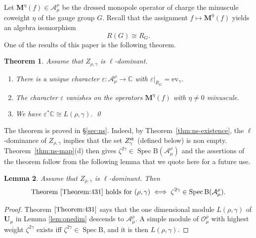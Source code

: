 \documentclass[11pt,reqno]{amsart}
\newtheorem{Theorem}{Theorem}[section]
\newtheorem{Lemma}[Theorem]{Lemma}
\theoremstyle{definition}
\theoremstyle{remark}
\def\bbC{\mathbb C}
\def\scrO{\mathscr O}
\def\B{\mathrm B}
\def\calA{\mathcal A}
\def\bfU{\mathbf U}
\def\Spec{\operatorname{Spec}}
\def\ev{\mathrm{ev}}
\providecommand{\bfM}{\mathbf M}
\begin{document}
Let $\bfM^\eta(f)\in\calA^\rho_\mu$ be the dressed monopole operator of charge the minuscule coweight $\eta$ of the gauge group $G$.
Recall that the assignment $f\mapsto \bfM^0(f)$ yields an algebra isomorphism
$$R(G)\cong R_G.$$
One of the results of this paper is the following theorem.


\begin{Theorem}\label{Theorem:431}
Assume that $Z_{\rho,\gamma}$ is $\ell$-dominant.
\begin{enumerate}[label=$\mathrm{(\alph*)}$,leftmargin=8mm]
\item
 There is a unique character $\varepsilon:\calA^\rho_\mu\to\bbC$ with
$\varepsilon|_{R_G}=\ev_\gamma$. 
\item
The character $\varepsilon$ vanishes on the operators $\bfM^\eta(f)$ with $\eta\neq0$ minuscule.
\item
We have 
$\varepsilon^*\bbC\cong L(\rho,\gamma).$
\qed
\end{enumerate}
\end{Theorem}


The theorem is proved in \S\ref{sec:ns}.
Indeed, by Theorem~\ref{thm:ns-existence}, the $\ell$-dominance of $Z_{\rho,\gamma}$ implies that
the set $Z_\gamma^{\rm st}$ (defined below) is non empty.
Theorem~\ref{thm:ns-map}(d) then gives
$\zeta^{2\gamma}\in\Spec\B(\calA^\rho_\mu)$ and 
the assertions of the theorem follow from the following lemma that we quote here for a future use.



\begin{Lemma}\label{lem:Bcrit}
Assume that $Z_{\rho,\gamma}$ is $\ell$-dominant. Then
$$\text{Theorem $\ref{Theorem:431}$ holds for $(\rho,\gamma)$}\iff \zeta^{2\gamma}\in\Spec\B(\calA^\rho_\mu).$$
\end{Lemma}

\begin{proof}
Theorem $\ref{Theorem:431}$ says that the one dimensional module 
$L(\rho,\gamma)$ of $\bfU_\mu$ in Lemma \ref{lem:onedim} descends to $\calA^\rho_\mu$.
A simple module of $\scrO^\rho_\mu$ with highest weight $\zeta^{2\gamma}$ exists iff $\zeta^{2\gamma}\in\Spec\B$, 
and it is then $L(\rho,\gamma)$. 
\end{proof}
\end{document}
